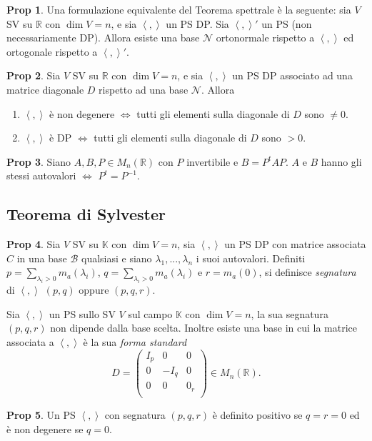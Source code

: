 \documentclass[]{article}
\newcommand{\scalprod}[2]{\left\langle #1 , #2 \right\rangle}
\theoremstyle{definition}
\theoremstyle{definition}
\newtheorem{prop}{Prop}[subsection]
\theoremstyle{definition}
\begin{document}
\begin{prop} Una formulazione equivalente del Teorema spettrale è la seguente: sia $V$ SV su $\mathbb{R}$ con $\dim V=n$, e sia $\scalprod{}{}$ un PS DP. Sia $\scalprod{}{}'$ un PS (non necessariamente DP). Allora esiste una base $\mathcal{N}$ ortonormale rispetto a $\scalprod{}{}$ ed ortogonale rispetto a $\scalprod{}{}'$.

\end{prop} \begin{prop} Sia $V$ SV su $\mathbb{R}$ con $\dim V=n$, e sia $\scalprod{}{}$ un PS DP associato ad una matrice diagonale $D$ rispetto ad una base $\mathcal{N}$. Allora 
\begin{enumerate}
	\item $\scalprod{}{}$ è non degenere $\Leftrightarrow$ tutti gli elementi sulla diagonale di $D$ sono $\neq 0$.
	\item $\scalprod{}{}$ è DP $\Leftrightarrow$ tutti gli elementi sulla diagonale di $D$ sono $> 0$.
\end{enumerate} 
\end{prop} 
 
\begin{prop} Siano $A,B,P \in M_n (\mathbb{R})$ con $P$ invertibile e $B=P^t AP$. $A$ e $B$ hanno gli stessi autovalori $\Leftrightarrow$ $P^t = P^{-1}$.
\end{prop}

\subsection{Teorema di Sylvester} 

\begin{prop} Sia $V$ SV su $\mathbb{K}$ con $\dim V=n$, sia $\scalprod{}{}$ un PS DP con matrice associata $C$ in una base $\mathcal{B}$ qualsiasi e siano $\lambda _1 ,..., \lambda _n$ i suoi autovalori. Definiti $p=\sum _{\lambda_i > 0} m_a (\lambda_i )$, $q=\sum _{\lambda_i > 0} m_a (\lambda_i )$ e $r=m_a (0)$, si definisce \emph{segnatura} di $\scalprod{}{}$ $(p,q)$ oppure $(p,q,r)$.

\end{prop} \begin{thm} Sia $\scalprod{}{}$ un PS sullo SV $V$ sul campo $\mathbb{K}$ con $\dim V =n$, la sua segnatura $(p,q,r)$ non dipende dalla base scelta. Inoltre esiste una base in cui la matrice associata a $\scalprod{}{}$ è la sua \emph{forma standard}
$$D=\begin{pmatrix}
	I_p	& 0		& 0		\\
	0	& -I_q	& 0		\\
	0	& 0 	& 0_r	\\
\end{pmatrix} \in M_n (\mathbb{R}).$$

\end{thm} \begin{prop} Un PS $\scalprod{}{}$ con segnatura $(p,q,r)$ è definito positivo se $q=r=0$ ed è non degenere se $q=0$.
\end{prop}
\end{document}
